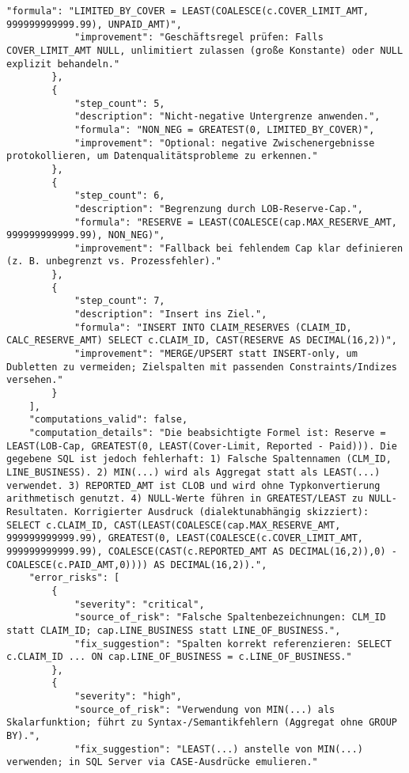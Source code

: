\begin{lstlisting}[caption={Ausgabe: GPT-5 Anwendungsfall 10 Robustheitsdurchlauf},label={gpt_case10_prompt3}]
            "formula": "LIMITED_BY_COVER = LEAST(COALESCE(c.COVER_LIMIT_AMT, 999999999999.99), UNPAID_AMT)",
            "improvement": "Geschäftsregel prüfen: Falls COVER_LIMIT_AMT NULL, unlimitiert zulassen (große Konstante) oder NULL explizit behandeln."
        },
        {
            "step_count": 5,
            "description": "Nicht-negative Untergrenze anwenden.",
            "formula": "NON_NEG = GREATEST(0, LIMITED_BY_COVER)",
            "improvement": "Optional: negative Zwischenergebnisse protokollieren, um Datenqualitätsprobleme zu erkennen."
        },
        {
            "step_count": 6,
            "description": "Begrenzung durch LOB-Reserve-Cap.",
            "formula": "RESERVE = LEAST(COALESCE(cap.MAX_RESERVE_AMT, 999999999999.99), NON_NEG)",
            "improvement": "Fallback bei fehlendem Cap klar definieren (z. B. unbegrenzt vs. Prozessfehler)."
        },
        {
            "step_count": 7,
            "description": "Insert ins Ziel.",
            "formula": "INSERT INTO CLAIM_RESERVES (CLAIM_ID, CALC_RESERVE_AMT) SELECT c.CLAIM_ID, CAST(RESERVE AS DECIMAL(16,2))",
            "improvement": "MERGE/UPSERT statt INSERT-only, um Dubletten zu vermeiden; Zielspalten mit passenden Constraints/Indizes versehen."
        }
    ],
    "computations_valid": false,
    "computation_details": "Die beabsichtigte Formel ist: Reserve = LEAST(LOB-Cap, GREATEST(0, LEAST(Cover-Limit, Reported - Paid))). Die gegebene SQL ist jedoch fehlerhaft: 1) Falsche Spaltennamen (CLM_ID, LINE_BUSINESS). 2) MIN(...) wird als Aggregat statt als LEAST(...) verwendet. 3) REPORTED_AMT ist CLOB und wird ohne Typkonvertierung arithmetisch genutzt. 4) NULL-Werte führen in GREATEST/LEAST zu NULL-Resultaten. Korrigierter Ausdruck (dialektunabhängig skizziert): SELECT c.CLAIM_ID, CAST(LEAST(COALESCE(cap.MAX_RESERVE_AMT, 999999999999.99), GREATEST(0, LEAST(COALESCE(c.COVER_LIMIT_AMT, 999999999999.99), COALESCE(CAST(c.REPORTED_AMT AS DECIMAL(16,2)),0) - COALESCE(c.PAID_AMT,0)))) AS DECIMAL(16,2)).",
    "error_risks": [
        {
            "severity": "critical",
            "source_of_risk": "Falsche Spaltenbezeichnungen: CLM_ID statt CLAIM_ID; cap.LINE_BUSINESS statt LINE_OF_BUSINESS.",
            "fix_suggestion": "Spalten korrekt referenzieren: SELECT c.CLAIM_ID ... ON cap.LINE_OF_BUSINESS = c.LINE_OF_BUSINESS."
        },
        {
            "severity": "high",
            "source_of_risk": "Verwendung von MIN(...) als Skalarfunktion; führt zu Syntax-/Semantikfehlern (Aggregat ohne GROUP BY).",
            "fix_suggestion": "LEAST(...) anstelle von MIN(...) verwenden; in SQL Server via CASE-Ausdrücke emulieren."

\end{lstlisting}
